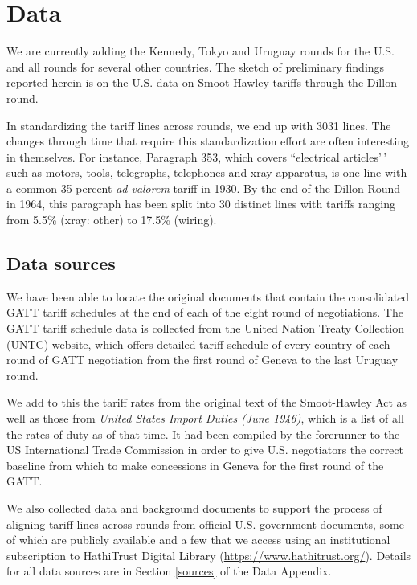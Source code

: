 \documentclass[
  12pt,
]{article}
\begin{document}
\hypertarget{data}{%
\section{Data}\label{data}}

We are currently adding the Kennedy, Tokyo and Uruguay rounds for the U.S. and all rounds for several other countries. The sketch of preliminary findings reported herein is on the U.S. data on Smoot Hawley tariffs through the Dillon round.

In standardizing the tariff lines across rounds, we end up with 3031 lines. The changes through time that require this standardization effort are often interesting in themselves. For instance, Paragraph 353, which covers ``electrical articles'\,' such as motors, tools, telegraphs, telephones and xray apparatus, is one line with a common 35 percent \emph{ad valorem} tariff in 1930. By the end of the Dillon Round in 1964, this paragraph has been split into 30 distinct lines with tariffs ranging from 5.5\% (xray: other) to 17.5\% (wiring).

\hypertarget{data-sources}{%
\subsection{Data sources}\label{data-sources}}

We have been able to locate the original documents that contain the consolidated GATT tariff schedules at the end of each of the eight round of negotiations. The GATT tariff schedule data is collected from the United Nation Treaty Collection (UNTC) website, which offers detailed tariff schedule of every country of each round of GATT negotiation from the first round of Geneva to the last Uruguay round.

We add to this the tariff rates from the original text of the Smoot-Hawley Act as well as those from \emph{United States Import Duties (June 1946)}, which is a list of all the rates of duty as of that time. It had been compiled by the forerunner to the US International Trade Commission in order to give U.S. negotiators the correct baseline from which to make concessions in Geneva for the first round of the GATT.

We also collected data and background documents to support the process of aligning tariff lines across rounds from official U.S. government documents, some of which are publicly available and a few that we access using an institutional subscription to HathiTrust Digital Library (\url{https://www.hathitrust.org/}). Details for all data sources are in Section \ref{sources} of the Data Appendix.
\end{document}
